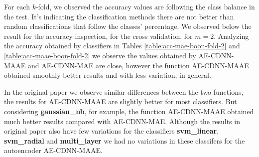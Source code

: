 For each $k$-fold, we observed the accuracy values are following the class balance in the test. It's indicating the classification methods there are not better than random classifications that follow the classes' percentage. We observed below the result for the accuracy inspection, for the cross validation, for $m = 2$. Analyzing the accuracy obtained by classifiers in Tables \ref{table:acc-mae-boon-fold-2} and \ref{table:acc-maae-boon-fold-2} we observe the values obtained by AE-CDNN-MAAE and AE-CDNN-MAE are close, however the function AE-CDNN-MAAE obtained smoothly better results and with less variation, in general. 





In the original paper we observe similar differences between the two functions, the results for AE-CDNN-MAAE are slightly better for most classifiers. But considering \textbf{gaussian\_nb}, for example, the function AE-CDNN-MAAE obtained much better results compared with AE-CDNN-MAE. Although the results in original paper also have few variations for the classifiers \textbf{svm\_linear}, \textbf{svm\_radial} and \textbf{multi\_layer} we had no variations in these classifers for the autoencoder AE-CDNN-MAAE.

